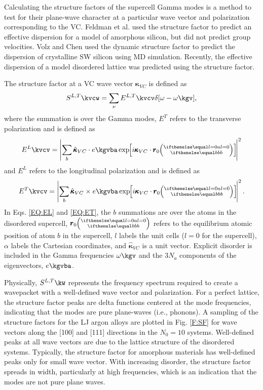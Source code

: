 Calculating the structure factors of the supercell Gamma   
modes is a method to test for their plane-wave 
character at a particular wave vector and 
polarization corresponding to the VC. 
\cite{allen_diffusons_1999,feldman_numerical_1999} 
Feldman et al. used the structure factor to predict an effective 
dispersion for a model of amorphous silicon, but did not predict 
group velocities.\cite{feldman_numerical_1999} 
Volz and Chen used the dynamic structure factor to predict the
dispersion of crystalline SW silicon using MD simulation.
\cite{volz_molecular-dynamics_2000} Recently, the effective dispersion 
of a model disordered lattice was predicted using the structure factor.
\cite{beltukov_ioffe_2013}

The structure factor at a VC wave vector 
$\pmb{\kappa}_{VC}$ is defined as\cite{allen_diffusons_1999} 
\begin{equation}\label{EQ:SLT}
S^{L,T}\kvcw = 
\sum_{\nu} E^{L,T}\kvcv
\delta [\omega-\omega\kgv],
\end{equation}
where the summation is over the Gamma modes, $E^{T}$ refers 
to the transverse polarization and is defined as
\begin{equation}\label{EQ:EL}
E^L\kvcv = 
\left|
\sum_{b} 
\hat{\pmb{\kappa}}_{VC} \cdot e\kgvba 
\EXP{i\pmb{\kappa}_{VC}\cdot\pmb{r}_0\ab{l=0}{b}} 
\right|^2
\end{equation}
and $E^{L}$ refers to the longitudinal polarization and is defined as
\begin{equation}\label{EQ:ET}
E^T\kvcv = 
\left|
\sum_{b} 
\hat{\pmb{\kappa}}_{VC} \times e\kgvba 
\EXP{i\pmb{\kappa}_{VC}\cdot\pmb{r}_0\ab{l=0}{b}} 
\right|^2.
\end{equation}
In Eqs. \eqref{EQ:EL} and \eqref{EQ:ET}, the $b$ summations are 
over the atoms in the disordered supercell, 
$\pmb{r}_0\ab{l=0}{b}$ refers to the equilibrium atomic position of 
atom $b$ in the supercell, $l$ labels the unit cells 
($l=0$ for the supercell), 
$\alpha$ labels the Cartesian coordinates, and 
$\hat{\pmb{\kappa}}_{VC}$ is a unit vector.  
Explicit disorder is included in the Gamma frequencies 
$\omega\kgv$ and the $3N_a$ components of the eigenvectors, $e\kgvba$.

Physically, $S^{L,T}\kw$ represents  
the frequency spectrum required to create a wavepacket with a 
well-defined wave vector and polarization.
\cite{allen_diffusons_1999,feldman_numerical_1999,green_density_2011} 
For a perfect lattice, the 
structure factor peaks are delta functions centered at the mode 
frequencies, indicating that the modes are pure plane-waves 
(i.e., phonons). 
A sampling of the structure factors for the LJ argon alloys 
are plotted in Fig. \ref{F:SF} for wave vectors along the [100] and [111] 
directions in the $N_0=10$ systems.\cite{vc_fn1}  
Well-defined peaks 
at all wave vectors are due to the 
lattice structure of the disordered systems. 
Typically, the structure factor for amorphous materials has well-defined 
peaks only for small wave vector.
\cite{allen_diffusons_1999,feldman_numerical_1999} 
With increasing disorder, the structure factor spreads in width,  
particularly at high frequencies, which is an indication that the 
modes are not pure plane waves. 

